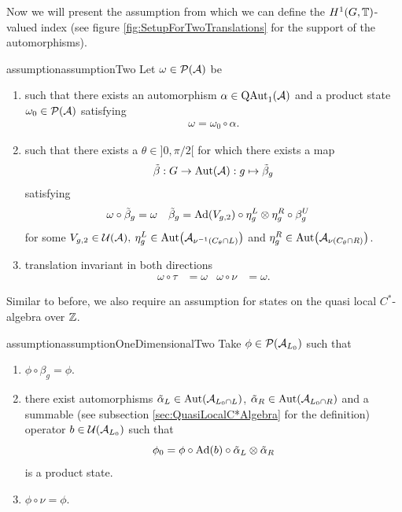 \documentclass[12pt,a4paper,twoside]{article}
\numberwithin{equation}{section}
\begin{document}

Now we will present the assumption from which we can define the $H^1(G,\mathbb T)$-valued index (see figure \ref{fig:SetupForTwoTranslations} for the support of the automorphisms).
\begin{restatable}{assumption}{assumptionTwo}\label{assumption:2Translations}
	Let $\omega\in\mathcal P(\mathcal A)$ be
	\begin{enumerate}
		\item such that there exists an automorphism $\alpha\in\QAut{\AA}$ and a product state $\omega_0\in\mathcal P(\mathcal A)$ satisfying
		\begin{align}
			\omega=\omega_0\circ\alpha.
		\end{align}
		\item such that there exists a $\theta\in]0,\pi/2[$ for which there exists a map
		\begin{equation}
			\tilde\beta:G\rightarrow\Aut{\AA}:g\mapsto\tilde\beta_g
		\end{equation}
		satisfying
		\begin{align}
			\label{eq:2TranslationsCondition3part1}
			\omega\circ\tilde\beta_g&=\omega&\tilde\beta_g&=\Ad{V_{g,2}}\circ\eta^L_g\otimes\eta^R_g\circ\beta^U_g
		\end{align}
		for some $V_{g,2}\in\mathcal U(\mathcal A),$ $\eta^L_g\in\Aut{\AA_{\nu^{-1}(C_\theta\cap L)}}$ and  $\eta^R_g\in\Aut{\AA_{\nu(C_\theta\cap R)}}$.
		\item translation invariant in both directions
		\begin{align}
			\omega\circ\tau&=\omega&\omega\circ\nu&=\omega.
		\end{align}
	\end{enumerate}
\end{restatable}
Similar to before, we also require an assumption for states on the quasi local $C^*$-algebra over $\mathbb Z$.
\begin{restatable}{assumption}{assumptionOneDimensionalTwo}\label{assumption1dWithTranslation}
	Take $\phi\in\mathcal P(\mathcal A_{L_0})$ such that
	\begin{enumerate}
		\item $\phi\circ\beta_g=\phi$.
		\item there exist automorphisms $\tilde\alpha_L\in\Aut{\AA_{L_0\cap L}}$, $\tilde\alpha_R\in\Aut{\AA_{L_0\cap R}}$ and a summable (see subsection \ref{sec:QuasiLocalC*Algebra} for the definition) operator $b\in\mathcal U(\mathcal A_{L_0})$ such that
		\begin{equation}
			\phi_0=\phi\circ\Ad{b}\circ\tilde\alpha_L\otimes\tilde\alpha_R
		\end{equation}
		is a product state.
		\item $\phi\circ\nu=\phi$.
	\end{enumerate}
\end{restatable}
\end{document}
